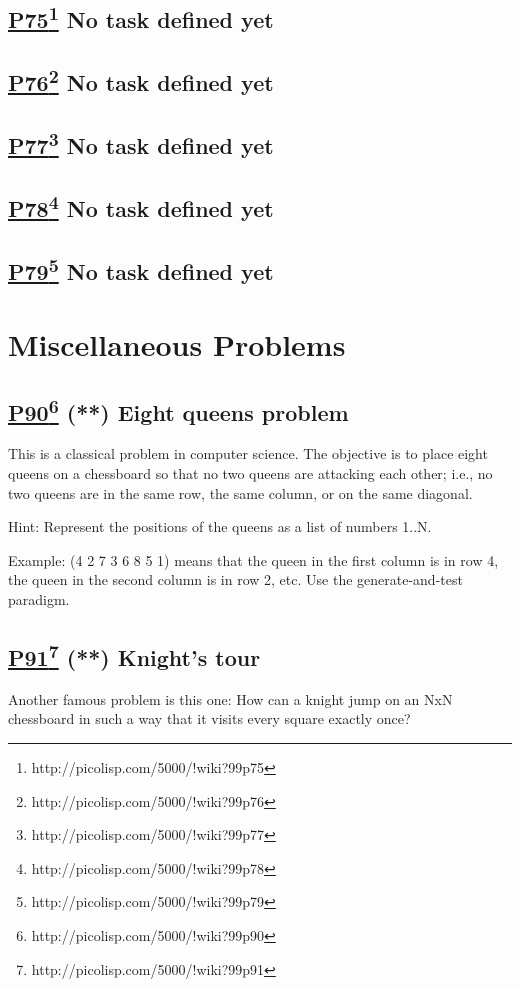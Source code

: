 \documentclass[10pt,a4paper]{article}
\begin{document}
\subsection*{\underline{P75}\footnote{http://picolisp.com/5000/!wiki?99p75} No task defined yet}
\subsection*{\underline{P76}\footnote{http://picolisp.com/5000/!wiki?99p76} No task defined yet}
\subsection*{\underline{P77}\footnote{http://picolisp.com/5000/!wiki?99p77} No task defined yet}
\subsection*{\underline{P78}\footnote{http://picolisp.com/5000/!wiki?99p78} No task defined yet}
\subsection*{\underline{P79}\footnote{http://picolisp.com/5000/!wiki?99p79} No task defined yet}

\section*{Miscellaneous Problems}

\subsection*{\underline{P90}\footnote{http://picolisp.com/5000/!wiki?99p90} (**) Eight queens problem}
This is a classical problem in computer science. The objective is to place eight
queens on a chessboard so that no two queens are attacking each other; i.e., no
two queens are in the same row, the same column, or on the same
diagonal.

Hint: Represent the positions of the queens as a list of numbers 1..N.

Example: (4 2 7 3 6 8 5 1) means that the queen in the first column is in row 4,
the queen in the second column is in row 2, etc. Use the generate-and-test
paradigm.

\subsection*{\underline{P91}\footnote{http://picolisp.com/5000/!wiki?99p91} (**) Knight's tour}
Another famous problem is this one: How can a knight jump on
an NxN chessboard in such a way that it visits every square exactly
once?
\end{document}
